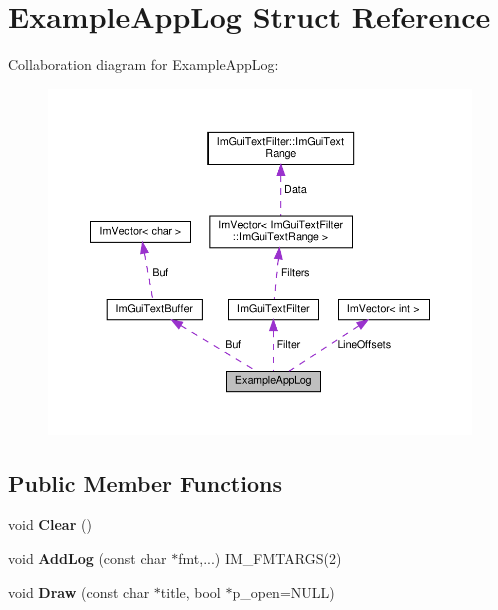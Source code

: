 \hypertarget{structExampleAppLog}{}\section{Example\+App\+Log Struct Reference}
\label{structExampleAppLog}


Collaboration diagram for Example\+App\+Log\+:\nopagebreak
\begin{figure}[H]
\begin{center}
\leavevmode
\includegraphics[width=350pt]{structExampleAppLog__coll__graph}
\end{center}
\end{figure}
\subsection*{Public Member Functions}
\begin{DoxyCompactItemize}
\item 
\mbox{\label{structExampleAppLog_ab9c298defddbb106fdfe4ab16c5eebac}} 
void {\bfseries Clear} ()
\item 
\mbox{\label{structExampleAppLog_afd296fb3b2559acd341fd92883f8f571}} 
void {\bfseries Add\+Log} (const char $\ast$fmt,...) I\+M\+\_\+\+F\+M\+T\+A\+R\+GS(2)
\item 
\mbox{\label{structExampleAppLog_a5ad3a4bdb89171b84aeaff96948a1f77}} 
void {\bfseries Draw} (const char $\ast$title, bool $\ast$p\+\_\+open=N\+U\+LL)
\end{DoxyCompactItemize}
